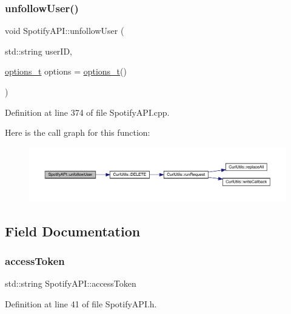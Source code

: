 \subsubsection{\texorpdfstring{unfollow\+User()}{unfollowUser()}}
{\footnotesize\ttfamily void Spotify\+A\+P\+I\+::unfollow\+User (\begin{DoxyParamCaption}\item[{std\+::string}]{user\+ID,  }\item[{\mbox{\hyperlink{_spotify_a_p_i_8h_a0ff5cac1a4007bb330b7d9939650c283}{options\+\_\+t}}}]{options = {\ttfamily \mbox{\hyperlink{_spotify_a_p_i_8h_a0ff5cac1a4007bb330b7d9939650c283}{options\+\_\+t}}()} }\end{DoxyParamCaption})}



Definition at line 374 of file Spotify\+A\+P\+I.\+cpp.

Here is the call graph for this function\+:
\nopagebreak
\begin{figure}[H]
\begin{center}
\leavevmode
\includegraphics[width=350pt]{class_spotify_a_p_i_a7f8c5253bf0fc8cbe8944edfc96ff030_cgraph}
\end{center}
\end{figure}


\subsection{Field Documentation}
\mbox{\label{class_spotify_a_p_i_aff771a96c8035e8249c991728441c69f}} 
\subsubsection{\texorpdfstring{access\+Token}{accessToken}}
{\footnotesize\ttfamily std\+::string Spotify\+A\+P\+I\+::access\+Token\hspace{0.3cm}{\ttfamily [private]}}



Definition at line 41 of file Spotify\+A\+P\+I.\+h.

